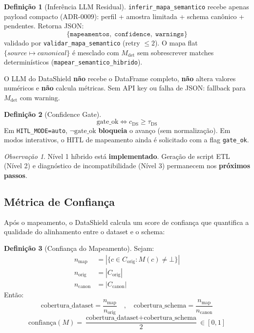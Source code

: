 \documentclass[a4paper, 12pt]{report}
\theoremstyle{definition}
\newtheorem{definicao}{Defini\c{c}\~ao}[chapter]
\theoremstyle{remark}
\newtheorem{observacao}{Observa\c{c}\~ao}[chapter]
\begin{document}
\begin{definicao}[Infer\^encia LLM Residual]
  \texttt{inferir\_mapa\_semantico} recebe apenas payload compacto
  (ADR-0009): perfil + amostra limitada + schema can\^onico +
  pendentes. Retorna JSON:
  \[
    \{\texttt{mapeamentos},\; \texttt{confidence},\; \texttt{warnings}\}
  \]
  validado por \texttt{validar\_mapa\_semantico} (retry $\leq 2$).
  O mapa flat $\{source \mapsto canonical\}$ \'e mesclado com
  $M_{\text{det}}$ sem sobrescrever matches determin\'isticos
  (\texttt{mapear\_semantico\_hibrido}).
\end{definicao}

\begin{caixaguardrail}
  O LLM do DataShield \textbf{n\~ao} recebe o DataFrame completo,
  \textbf{n\~ao} altera valores num\'ericos e \textbf{n\~ao} calcula
  m\'etricas. Sem API key ou falha de JSON: fallback para
  $M_{\text{det}}$ com warning.
\end{caixaguardrail}

\begin{definicao}[Confidence Gate]
  \[
    \text{gate\_ok} \iff c_{\text{DS}} \geq \tau_{\text{DS}}
  \]
  Em \texttt{HITL\_MODE=auto}, $\neg\text{gate\_ok}$ \textbf{bloqueia}
  o avan\c{c}o (sem normaliza\c{c}\~ao). Em modos interativos, o HITL
  de mapeamento ainda \'e solicitado com a flag \texttt{gate\_ok}.
\end{definicao}

\begin{observacao}
  N\'ivel 1 h\'ibrido est\'a \textbf{implementado}. Gera\c{c}\~ao de
  script ETL (N\'ivel 2) e diagn\'ostico de incompatibilidade
  (N\'ivel 3) permanecem nos \textbf{pr\'oximos passos}.
\end{observacao}


\subsection{M\'etrica de Confian\c{c}a}

Ap\'os o mapeamento, o DataShield calcula um score de confian\c{c}a
que quantifica a qualidade do alinhamento entre o dataset e o schema:

\begin{definicao}[Confian\c{c}a do Mapeamento]
  Sejam:
  \begin{align*}
    n_{\text{map}} &= |\{c \in C_{\text{orig}} : M(c) \neq \bot\}| \\
    n_{\text{orig}} &= |C_{\text{orig}}| \\
    n_{\text{canon}} &= |C_{\text{canon}}|
  \end{align*}
  Ent\~ao:
  \[
    \text{cobertura\_dataset} = \frac{n_{\text{map}}}{n_{\text{orig}}}
    \quad,\quad
    \text{cobertura\_schema} = \frac{n_{\text{map}}}{n_{\text{canon}}}
  \]
  \[
    \text{confian\c{c}a}(M) = \frac{\text{cobertura\_dataset} + \text{cobertura\_schema}}{2}
    \in [0, 1]
  \]
\end{definicao}
\end{document}
